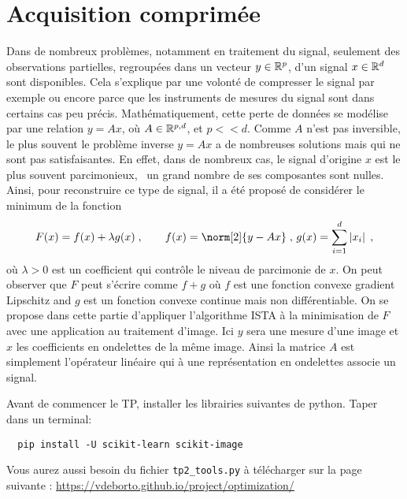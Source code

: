 \documentclass[a4paper,french,12pt]{article}
\begin{document}
\section{Acquisition comprimée}
%
Dans de nombreux problèmes, notamment en traitement du signal,
seulement des observations partielles, regroupées dans un vecteur
$y \in \mathbb{R}^p$, d'un signal $x \in \mathbb{R}^d$ sont disponibles. Cela
s'explique par une volonté de compresser le signal par exemple ou
encore parce que les instruments de mesures du signal sont dans
certains cas peu précis. Mathématiquement, cette perte de données se
modélise par une relation $y=Ax$, où $A \in \mathbb{R}^{p,d}$, et $p <<
d$. Comme $A$ n'est pas inversible, le plus souvent le problème
inverse $y=Ax$ a de nombreuses solutions mais qui ne sont pas
satisfaisantes. En effet, dans de nombreux cas, le signal d'origine
$x$ est le plus souvent parcimonieux, \ie~un grand nombre de ses
composantes sont nulles. Ainsi, pour reconstruire ce type de signal,
il a été proposé de considérer le minimum de la fonction
\begin{equation*}
  F(x) = f(x) + \lambda g(x) \eqsp, \qquad f(x) = \norm[2]{y-Ax} \eqsp, \,  g(x) =  \sum_{i=1}^d \abs{x_i} \eqsp,
\end{equation*}
où $\lambda >0$ est un coefficient qui contrôle le niveau de
parcimonie de $x$.  On peut observer que $F$ peut s'écrire comme $f+g$
où $f$ est une fonction convexe gradient Lipschitz and $g$ est un
fonction convexe continue mais non différentiable. On se propose dans
cette partie d'appliquer l'algorithme ISTA à la minimisation de $F$
avec une application au traitement d'image.
Ici $y$ sera une mesure d'une image et $x$ les coefficients en ondelettes de
la même image. Ainsi la matrice $A$ est simplement l'opérateur linéaire qui à une représentation en ondelettes associe
un signal.

Avant de commencer le TP, installer les librairies suivantes de python. Taper dans un terminal:
\begin{lstlisting}
  pip install -U scikit-learn scikit-image
\end{lstlisting}

Vous aurez aussi besoin du fichier \lstinline+tp2_tools.py+ à télécharger sur la page suivante : \url{https://vdeborto.github.io/project/optimization/}
\end{document}
